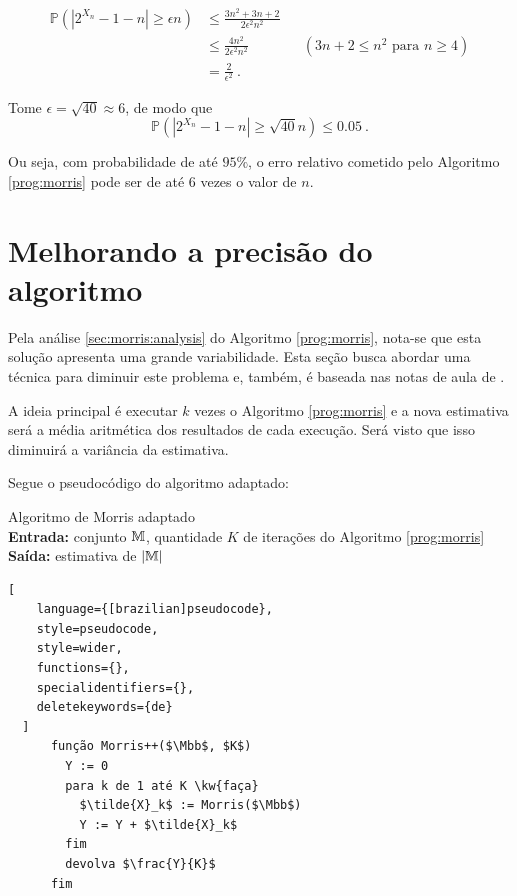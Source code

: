 \begin{align*}
  \mathbb{P}(|2^{X_n} - 1 - n| \geq \epsilon n) 
    &\leq \frac{3n^2 + 3n + 2}{2 \epsilon^2 n^2}  \\
    &\leq \frac{4n^2}{2 \epsilon^2 n^2}  &&(\text{$3n + 2 \leq n^2$ para $n \geq 4$}) \\
    &= \frac{2}{\epsilon^2} \ .
\end{align*}

Tome $\epsilon = \sqrt{40} \approx 6 $, de modo que 
\[ \mathbb{P}(|2^{X_n} - 1 - n| \geq \sqrt{40} n)  \leq 0.05 \ . \]

Ou seja, com probabilidade de até $95\%$, o erro relativo cometido pelo Algoritmo \ref{prog:morris} pode ser de até $6$ vezes o valor de $n$.


\section{Melhorando a precisão do algoritmo}

Pela análise \ref{sec:morris:analysis} do Algoritmo \ref{prog:morris}, nota-se que esta solução apresenta uma grande variabilidade. 
Esta seção busca abordar uma técnica para diminuir este problema e, também, é baseada nas notas de aula de \citep{LectureNotesAndoni}.

A ideia principal é executar $k$ vezes o Algoritmo \ref{prog:morris} e a nova estimativa será a média aritmética dos resultados
de cada execução. Será visto que isso diminuirá a variância da estimativa.

Segue o pseudocódigo do algoritmo adaptado:
\begin{programruledcaption}{
Algoritmo de Morris adaptado\label{prog:morris:plus}
\\ \textbf{Entrada:} conjunto $\mathbb{M}$, quantidade $K$ de iterações do Algoritmo \ref{prog:morris} 
\\ \textbf{Saída:} estimativa de $|\mathbb{M}|$
\label{prog:flajolet-martin}
}
  \begin{lstlisting}[
    language={[brazilian]pseudocode},
    style=pseudocode,
    style=wider,
    functions={},
    specialidentifiers={},
    deletekeywords={de}
  ]
      função Morris++($\Mbb$, $K$)
        Y := 0
        para k de 1 até K \kw{faça}
          $\tilde{X}_k$ := Morris($\Mbb$)
          Y := Y + $\tilde{X}_k$
        fim
        devolva $\frac{Y}{K}$
      fim
  \end{lstlisting}
\end{programruledcaption}

